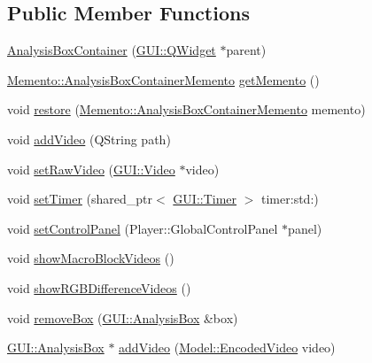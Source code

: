 \subsection*{Public Member Functions}
\begin{DoxyCompactItemize}
\item 
\hyperlink{classGUI_1_1AnalysisBoxContainer_ae603e523cc42100eccf571ff85ca39e8}{Analysis\+Box\+Container} (\hyperlink{classGUI_1_1QWidget}{G\+U\+I\+::\+Q\+Widget} $\ast$parent)
\item 
\hyperlink{classMemento_1_1AnalysisBoxContainerMemento}{Memento\+::\+Analysis\+Box\+Container\+Memento} \hyperlink{classGUI_1_1AnalysisBoxContainer_a0743a7c422123fbd5d22a946af5092ca}{get\+Memento} ()
\item 
void \hyperlink{classGUI_1_1AnalysisBoxContainer_af6d8c35bc3f7000da0579310af42e756}{restore} (\hyperlink{classMemento_1_1AnalysisBoxContainerMemento}{Memento\+::\+Analysis\+Box\+Container\+Memento} memento)
\item 
void \hyperlink{classGUI_1_1AnalysisBoxContainer_af3b761e148d9cb7352c5ffb4bf4c66bd}{add\+Video} (Q\+String path)
\item 
void \hyperlink{classGUI_1_1AnalysisBoxContainer_aa08759618dc05b98d60dc8942d41b556}{set\+Raw\+Video} (\hyperlink{classGUI_1_1Video}{G\+U\+I\+::\+Video} $\ast$video)
\item 
void \hyperlink{classGUI_1_1AnalysisBoxContainer_a678bedcbfc074efd29b5587a753fc341}{set\+Timer} (shared\+\_\+ptr$<$ \hyperlink{classGUI_1_1Timer}{G\+U\+I\+::\+Timer} $>$ timer\+:std\+:)
\item 
void \hyperlink{classGUI_1_1AnalysisBoxContainer_a9c1b482d1dcd6a733b84a9cdcc960263}{set\+Control\+Panel} (Player\+::\+Global\+Control\+Panel $\ast$panel)
\item 
void \hyperlink{classGUI_1_1AnalysisBoxContainer_ab3d9dc42d8e78c5bf6f87c5e93bdf1ce}{show\+Macro\+Block\+Videos} ()
\item 
void \hyperlink{classGUI_1_1AnalysisBoxContainer_a91638333a4b3fe577fd2062f2aa667f3}{show\+R\+G\+B\+Difference\+Videos} ()
\item 
void \hyperlink{classGUI_1_1AnalysisBoxContainer_a181a2114e38722fcae5a9c1d5b1d0ff7}{remove\+Box} (\hyperlink{classGUI_1_1AnalysisBox}{G\+U\+I\+::\+Analysis\+Box} \&box)
\item 
\hyperlink{classGUI_1_1AnalysisBox}{G\+U\+I\+::\+Analysis\+Box} $\ast$ \hyperlink{classGUI_1_1AnalysisBoxContainer_a483776769a5f7b2913128aa76251026b}{add\+Video} (\hyperlink{classModel_1_1EncodedVideo}{Model\+::\+Encoded\+Video} video)
\end{DoxyCompactItemize}
